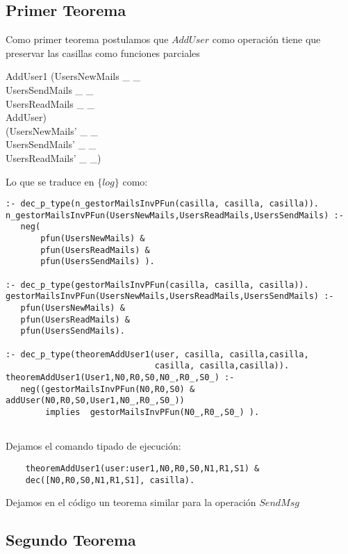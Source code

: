 \subsection{Primer Teorema}

Como primer teorema postulamos que $AddUser$ como operación tiene que preservar las casillas como funciones parciales

\begin{theorem}{AddUser1}
(UsersNewMails \in \_ \pfun \_ \land \\
UsersSendMails \in \_ \pfun \_ \land \\
UsersReadMails \in \_ \pfun \_ \land \\ AddUser) \implies \\ (UsersNewMails' \in \_ \pfun \_ \land\\
UsersSendMails' \in \_ \pfun \_ \land\\
UsersReadMails' \in \_ \pfun \_) 
\end{theorem}

Lo que se traduce en $\{log\}$ como:
\begin{verbatim}
:- dec_p_type(n_gestorMailsInvPFun(casilla, casilla, casilla)).
n_gestorMailsInvPFun(UsersNewMails,UsersReadMails,UsersSendMails) :-
   neg(
       pfun(UsersNewMails) & 
       pfun(UsersReadMails) &
       pfun(UsersSendMails) ).

:- dec_p_type(gestorMailsInvPFun(casilla, casilla, casilla)).
gestorMailsInvPFun(UsersNewMails,UsersReadMails,UsersSendMails) :-
   pfun(UsersNewMails) & 
   pfun(UsersReadMails) &
   pfun(UsersSendMails).

:- dec_p_type(theoremAddUser1(user, casilla, casilla,casilla,
                              casilla, casilla,casilla)). 
theoremAddUser1(User1,N0,R0,S0,N0_,R0_,S0_) :-
   neg((gestorMailsInvPFun(N0,R0,S0) & addUser(N0,R0,S0,User1,N0_,R0_,S0_)) 
        implies  gestorMailsInvPFun(N0_,R0_,S0_) ).
        
\end{verbatim}


Dejamos el comando tipado de ejecución:
\begin{verbatim}
    theoremAddUser1(user:user1,N0,R0,S0,N1,R1,S1) & 
    dec([N0,R0,S0,N1,R1,S1], casilla).
\end{verbatim}

Dejamos en el código un teorema similar para la operación $SendMsg$

\subsection{Segundo Teorema}

